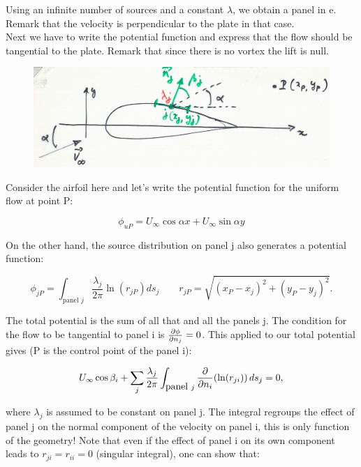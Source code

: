 	Using an infinite number of sources and a constant $\lambda$, we obtain a panel in e. Remark that the velocity is perpendicular to the plate in that case. \\
	
	Next we have to write the potential function and express that the flow should be tangential to the plate. Remark that since there is no vortex the lift is null. 
	
	\begin{figure}
	\vspace{-5mm}
	\includegraphics[scale=0.08]{ch2/41}
	\end{figure}
	Consider the airfoil here and let's write the potential function for the uniform flow at point P:
	
	\begin{equation}
	\phi _{uP} = U_\infty \cos \alpha x + U_\infty \sin \alpha y
	\end{equation}
	 
	 On the other hand, the source distribution on panel j also generates a potential function:
	 
	 \begin{equation}
	 \phi _{jP} = \int _{\mbox{panel } j} \frac{\lambda _j}{2\pi} \ln (r_{jP})ds_j\qquad r_{jP} = \sqrt{(x_P - x_j)^2 + (y_P - y_j)^2}.
	 \end{equation}
	 
	 The total potential is the sum of all that and all the panels j. The condition for the flow to be tangential to panel i is $\frac{\partial \phi}{\partial n_j} = 0$. This applied to our total potential gives (P is the control point of the panel i):
	 
	 \begin{equation}
	 U_\infty \cos \beta _i + \sum _j \frac{\lambda _j}{2\pi} \int _{\mbox{panel }j} \frac{\partial}{\partial n_i} (\ln (r_{ji})) \, ds_j = 0,
	 \end{equation}
	 
	 where $\lambda _j$ is assumed to be constant on panel j. The integral regroups the effect of panel j on the normal component of the velocity on panel i, this is only function of the geometry! Note that even if the effect of panel i on its own component leads to $r_{ji} = r_{ii} = 0$ (singular integral), one can show that:
	 
